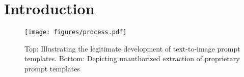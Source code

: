 \section{Introduction}

\begin{figure}
    \centering
    \texttt{[image: figures/process.pdf]}
    \caption{Top: Illustrating the legitimate development of text-to-image prompt templates. Bottom: Depicting unauthorized extraction of proprietary prompt templates}
    \label{fig1}
\end{figure}



